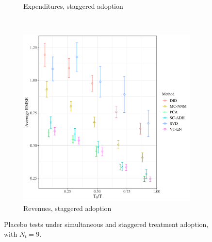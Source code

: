 \documentclass[12pt]{article}
\begin{document}
\begin{figure}[htbp]
\begin{subfigure}[t]{0.48\textwidth}
	\caption{Expenditures, staggered adoption}
\end{subfigure}
~ 
\begin{subfigure}[t]{0.48\textwidth}
	\centering
	\includegraphics[width=\textwidth]{plots/rev_pc_N_19_T_158_numruns_20_num_treated_10_simultaneuous_0.png}
	\caption{Revenues, staggered adoption}
\end{subfigure}
	\caption{Placebo tests under simultaneous and staggered treatment adoption, with $N_t = 9$. \label{mc-sim}} 
\end{figure}
\end{document}
